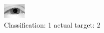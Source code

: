 \begin{figure}[h!]
\begin{center}
\includegraphics[width=0.60\columnwidth]{figures/ID2287_class_1_target_2.png}
\end{center}
\caption{ Classification: 1 actual target: 2}
\label{fig:ID2287_class_1_target_2}
\end{figure}
